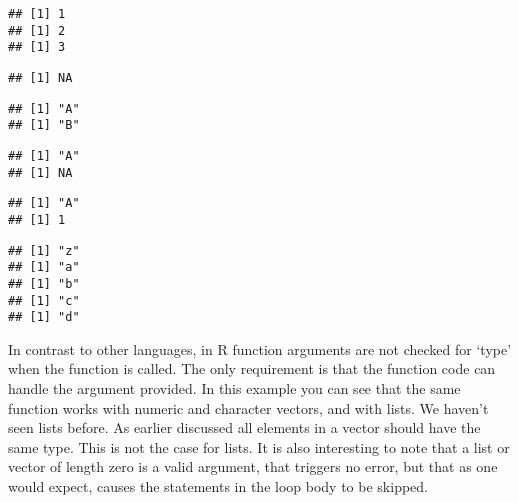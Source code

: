 \documentclass[paper=a4,10pt,div=17,headsepline,BCOR=12mm,twoside,open=right]{scrbook}\usepackage{knitr}
\begin{document}
\begin{knitrout}\footnotesize
{}\color{fgcolor}\begin{kframe}
\begin{alltt}
 \hlkwb{<-} \hlstd{(}\hlstd{) \{}
     
\hlstd{\}}
\hlstd{(}\hlstd{(}\hlstd{))}
\hlstd{(}\hlopt{:}\hlstd{)}
\end{alltt}
\begin{verbatim}
## [1] 1
## [1] 2
## [1] 3
\end{verbatim}
\begin{alltt}
\hlstd{(}\hlstd{)}
\end{alltt}
\begin{verbatim}
## [1] NA
\end{verbatim}
\begin{alltt}
\hlstd{(}\hlstd{(}\hlstd{,} \hlstd{))}
\end{alltt}
\begin{verbatim}
## [1] "A"
## [1] "B"
\end{verbatim}
\begin{alltt}
\hlstd{(}\hlstd{(}\hlstd{,} \hlstd{))}
\end{alltt}
\begin{verbatim}
## [1] "A"
## [1] NA
\end{verbatim}
\begin{alltt}
\hlstd{(}\hlstd{(}\hlstd{,} \hlstd{))}
\end{alltt}
\begin{verbatim}
## [1] "A"
## [1] 1
\end{verbatim}
\begin{alltt}
\hlstd{(}\hlstd{(}\hlstd{, letters[}\hlopt{:}\hlstd{]))}
\end{alltt}
\begin{verbatim}
## [1] "z"
## [1] "a"
## [1] "b"
## [1] "c"
## [1] "d"
\end{verbatim}
\end{kframe}
\end{knitrout}

In contrast to other languages, in R function arguments are not checked for `type' when the function is called. The only requirement is that the function code can handle the argument provided. In this example you can see that the same function works with numeric and character vectors, and with lists. We haven't seen lists before. As earlier discussed all elements in a vector should have the same type. This is not the case for lists. It is also interesting to note that a list or vector of length zero is a valid argument, that triggers no error, but that as one would expect, causes the statements in the loop body to be skipped.
\end{document}
